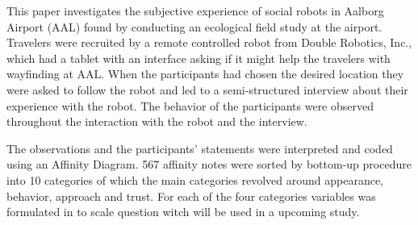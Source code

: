 \label{Abstract}
This paper investigates the subjective experience of social robots in Aalborg Airport (AAL) found by conducting an ecological field study at the airport. Travelers were recruited by a remote controlled robot from Double Robotics, Inc., which had a tablet with an interface asking if it might help the travelers with wayfinding at AAL. When the participants had chosen the desired location they were asked to follow the robot and led to a semi-structured interview about their experience with the robot. The behavior of the participants were observed throughout the interaction with the robot and the interview. 

The observations and the participants' statements were interpreted and coded using an Affinity Diagram. 567 affinity notes were sorted by bottom-up procedure into 10 categories of which the main categories revolved around appearance, behavior, approach and trust. For each of the four categories variables was formulated in to scale question witch will be used in a upcoming study. 

